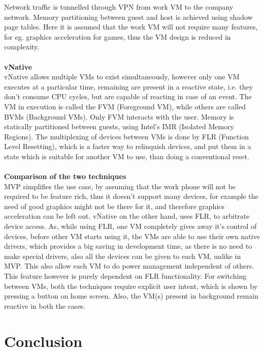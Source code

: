 \documentclass[a4paper,10pt]{article}
\begin{document}
  Network traffic is tunnelled through VPN from work VM to the company network. Memory partitioning between guest and host is achieved using shadow page tables.
  Here it is assumed that the work VM will not require many features, for eg. graphics acceleration for games, thus the VM design is reduced in complexity.
  \\\\
  \textbf{vNative}
  \\
  vNative allows multiple VMs to exist simultaneously, however only one VM executes at a particular time, remaining are present in a reactive state, i.e. they 
  don't consume CPU cycles, but are capable of reacting in case of an event. The VM in execution is called the FVM (Foreground VM), while others are called
  BVMs (Background VMs). Only FVM interacts with the user. Memory is statically partitioned between guests, using Intel's IMR (Isolated Memory Regions).
  The multiplexing of devices between VMs is done by FLR (Function Level Resetting), which is a faster way to relinquish devices, and put them in a state which
  is suitable for another VM to use, than doing a conventional reset.
  \\\\
  \textbf{Comparison of the two techniques}
  \\
  MVP simplifies the use case, by assuming that the work phone will not be required to be feature rich, thus it doesn't support many devices, for example the need of 
  good graphics might not be there for it, and therefore graphics acceleration can be left out.
  vNative on the other hand, uses FLR, to arbitrate device access. As, while using FLR, one VM completely gives away it's control of devices, before other
  VM starts using it, the VMs are able to use their own native drivers, which provides a big saving in development time, as there is no need to make special
  drivers, also all the devices can be given to each VM, unlike in MVP. This also allow each VM to do power management independent of others. This feature however is purely dependent on FLR functionality.
  For switching between VMs, both the techniques require explicit user intent, which is shown by pressing a button on home screen. Also, the VM(s) present in 
  background remain reactive in both the cases.
  
  
  


 


\section{Conclusion}
\clearpage
{}


\end{document}
